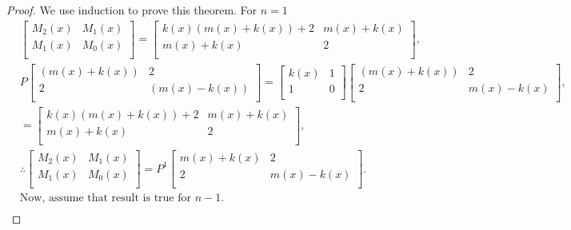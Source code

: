 \begin{proof}
We use induction to prove this theorem. For $n=1$
\begin{align*}
&{ \begin{bmatrix}
    M_{2}(x) & M_{1}(x) \\
    M_{1}(x) & M_{0}(x) \\
  \end{bmatrix}
}={
          \begin{bmatrix}
            k(x)(m(x)+k(x))+2 & m(x)+k(x) \\
            m(x)+k(x) & 2 \\
          \end{bmatrix}
      },\\
&P{\begin{bmatrix}
            (m(x)+k(x)) & 2 \\
            2	& (m(x)-k(x)) \\
          \end{bmatrix}
       }={
          \begin{bmatrix}
            k(x) & 1\\
            1 & 0 \\
          \end{bmatrix}
      }{
          \begin{bmatrix}
            (m(x)+k(x)) & 2 \\
            2 & m(x)-k(x) \\
          \end{bmatrix}
        },\\	
        &={
          \begin{bmatrix}
            k(x)(m(x)+k(x))+2 & m(x)+k(x) \\
            m(x)+k(x) & 2 \\
          \end{bmatrix}
       },\\
		&\therefore 			
	{
 \begin{bmatrix}
    M_{2}(x) & M_{1}(x) \\
    M_{1}(x) & M_{0}(x) \\
  \end{bmatrix}
}=P^1{
          \begin{bmatrix}
            m(x)+k(x) & 2 \\
            2 & m(x)-k(x) \\
          \end{bmatrix}}.\\
&\text{Now, assume that result is true for $n-1$. }\\

\end{align*}
\end{proof}
